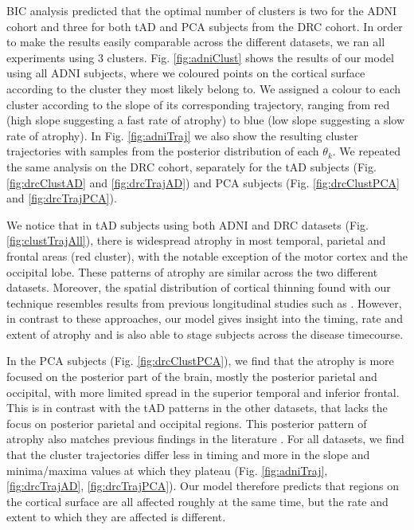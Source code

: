 \documentclass{llncs}
\begin{document}
BIC analysis predicted that the optimal number of clusters is two for the ADNI cohort and three for both tAD and PCA subjects from the DRC cohort. In order to make the results easily comparable across the different datasets, we ran all experiments using 3 clusters. Fig. \ref{fig:adniClust} shows the results of our model using all ADNI subjects, where we coloured points on the cortical surface according to the cluster they most likely belong to. We assigned a colour to each cluster according to the slope of its corresponding trajectory, ranging from red (high slope suggesting a fast rate of atrophy) to blue (low slope suggesting a slow rate of atrophy). In Fig. \ref{fig:adniTraj} we also show the resulting cluster trajectories with samples from the posterior distribution of each $\theta_k$. We repeated the same analysis on the DRC cohort, separately for the tAD subjects (Fig. \ref{fig:drcClustAD} and \ref{fig:drcTrajAD}) and PCA subjects (Fig. \ref{fig:drcClustPCA} and \ref{fig:drcTrajPCA}). 

We notice that in tAD subjects using both ADNI and DRC datasets (Fig. \ref{fig:clustTrajAll}), there is widespread atrophy in most temporal, parietal and frontal areas (red cluster), with the notable exception of the motor cortex and the occipital lobe. These patterns of atrophy are similar across the two different datasets. Moreover, the spatial distribution of cortical thinning found with our technique resembles results from previous longitudinal studies such as \cite{dickerson2009cortical}. However, in contrast to these approaches, our model gives insight into the timing, rate and extent of atrophy and is also able to stage subjects across the disease timecourse.

In the PCA subjects (Fig. \ref{fig:drcClustPCA}), we find that the atrophy is more focused on the posterior part of the brain, mostly the posterior parietal and occipital, with more limited spread in the superior temporal and inferior frontal. This is in contrast with the tAD patterns in the other datasets, that lacks the focus on posterior parietal and occipital regions. This posterior pattern of atrophy also matches previous findings in the literature \cite{crutch2012posterior}. For all datasets, we find that the cluster trajectories differ less in timing and more in the slope and minima/maxima values at which they plateau (Fig. \ref{fig:adniTraj}, \ref{fig:drcTrajAD}, \ref{fig:drcTrajPCA}). Our model therefore predicts that regions on the cortical surface are all affected roughly at the same time, but the rate and extent to which they are affected is different.   
\end{document}
